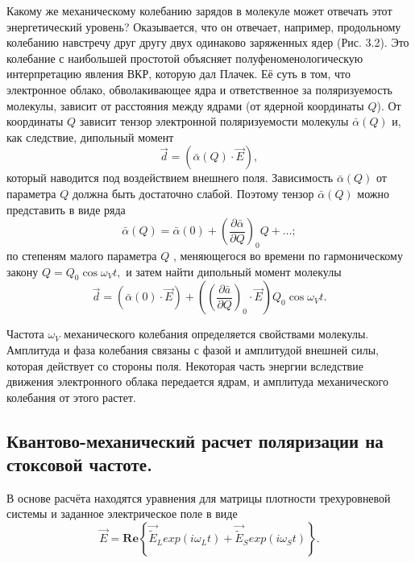 \documentclass[a4paper]{article}
\begin{document}
Какому же механическому колебанию зарядов в молекуле может отвечать этот энергетический уровень? Оказывается, что он отвечает, например, продольному колебанию навстречу друг другу двух одинаково заряженных ядер (Рис. 3.2). Это колебание с наибольшей простотой объясняет полуфеноменологическую интерпретацию явления ВКР, которую дал Плачек. Её суть в том, что электронное облако, обволакивающее ядра и ответственное за поляризуемость молекулы, зависит от расстояния между ядрами (от ядерной координаты $Q$). От координаты $Q$ зависит тензор электронной поляризуемости молекулы $\bar{\alpha}(Q)$ и, как следствие, дипольный момент 
\begin{equation}
	\vec{d}=\left(\bar{\alpha}(Q)\cdot\vec{E}\right),\label{1.3.2}
\end{equation}
который наводится под воздействием внешнего поля. Зависимость $\bar{\alpha}(Q)$ от параметра $Q$  должна быть достаточно слабой. Поэтому тензор $\bar{\alpha}(Q)$ можно представить в виде ряда 
\begin{equation}
	\bar{\alpha}(Q)=\bar{\alpha}(0)+\left(\frac{\partial\bar{\alpha}}{\partial Q}\right)_{0}Q+\dots;
	\label{1.3.3}
\end{equation}
по степеням малого параметра $Q$ , меняющегося во времени по гармоническому закону $Q=Q_{0}\cos\omega_{V}t,$ и затем найти дипольный момент молекулы
\begin{equation}
	\vec{d}=\left(\bar{\alpha}(0)\cdot\vec{E}\right)+\left(\left(\frac{\partial\bar{a}}{\partial Q}\right)_{0}\cdot\vec{E}\right)Q_{0}\cos\omega_{V}t.
	\label{1.3.4}
\end{equation}

Частота $\omega_{V}$ механического колебания определяется свойствами молекулы. 
Амплитуда и фаза колебания связаны с фазой и амплитудой внешней силы, которая действует со стороны поля. Некоторая часть энергии вследствие движения электронного облака передается ядрам, и амплитуда механического колебания от этого растет.

\subsection{Квантово-механический расчет поляризации на стоксовой частоте.}

В основе расчёта находятся уравнения для матрицы плотности трехуровневой системы и заданное электрическое поле в виде $$\vec{E}=\textbf{Re}\left\{\vec{\tilde{E}}_{L}exp(i\omega_{L}t)+\vec{\tilde{E}}_{S}exp(i\omega_{S}t)\right\}.$$
\end{document}
